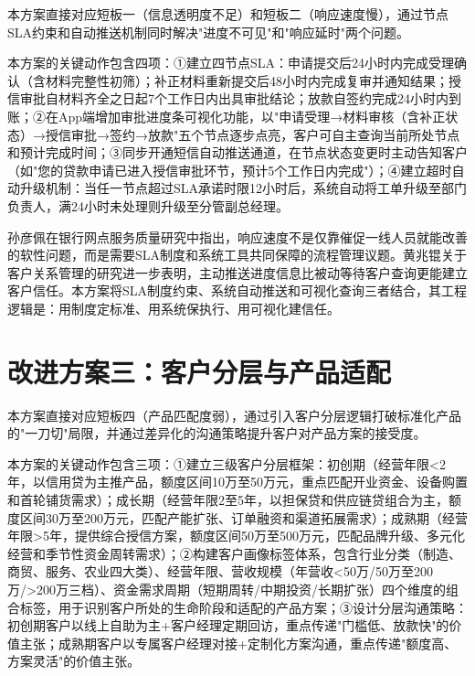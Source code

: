 本方案直接对应短板一（信息透明度不足）和短板二（响应速度慢），通过节点SLA约束和自动推送机制同时解决"进度不可见"和"响应延时"两个问题。\par

本方案的关键动作包含四项：①建立四节点SLA：申请提交后24小时内完成受理确认（含材料完整性初筛）；补正材料重新提交后48小时内完成复审并通知结果；授信审批自材料齐全之日起7个工作日内出具审批结论；放款自签约完成24小时内到账；②在App端增加审批进度条可视化功能，以"申请受理→材料审核（含补正状态）→授信审批→签约→放款"五个节点逐步点亮，客户可自主查询当前所处节点和预计完成时间；③同步开通短信自动推送通道，在节点状态变更时主动告知客户（如"您的贷款申请已进入授信审批环节，预计5个工作日内完成"）；④建立超时自动升级机制：当任一节点超过SLA承诺时限12小时后，系统自动将工单升级至部门负责人，满24小时未处理则升级至分管副总经理。\par

孙彦佩在银行网点服务质量研究中指出，响应速度不是仅靠催促一线人员就能改善的软性问题，而是需要SLA制度和系统工具共同保障的流程管理议题\cite{ref37}。黄兆锟关于客户关系管理的研究进一步表明，主动推送进度信息比被动等待客户查询更能建立客户信任\cite{ref38}。本方案将SLA制度约束、系统自动推送和可视化查询三者结合，其工程逻辑是：用制度定标准、用系统保执行、用可视化建信任。\par

\section{改进方案三：客户分层与产品适配}

本方案直接对应短板四（产品匹配度弱），通过引入客户分层逻辑打破标准化产品的"一刀切"局限，并通过差异化的沟通策略提升客户对产品方案的接受度。\par

本方案的关键动作包含三项：①建立三级客户分层框架：初创期（经营年限<2年，以信用贷为主推产品，额度区间10万至50万元，重点匹配开业资金、设备购置和首轮铺货需求）；成长期（经营年限2至5年，以担保贷和供应链贷组合为主，额度区间30万至200万元，匹配产能扩张、订单融资和渠道拓展需求）；成熟期（经营年限>5年，提供综合授信方案，额度区间50万至500万元，匹配品牌升级、多元化经营和季节性资金周转需求）；②构建客户画像标签体系，包含行业分类（制造、商贸、服务、农业四大类）、经营年限、营收规模（年营收<50万/50万至200万/>200万三档）、资金需求周期（短期周转/中期投资/长期扩张）四个维度的组合标签，用于识别客户所处的生命阶段和适配的产品方案；③设计分层沟通策略：初创期客户以线上自助为主+客户经理定期回访，重点传递"门槛低、放款快"的价值主张；成熟期客户以专属客户经理对接+定制化方案沟通，重点传递"额度高、方案灵活"的价值主张。\par

